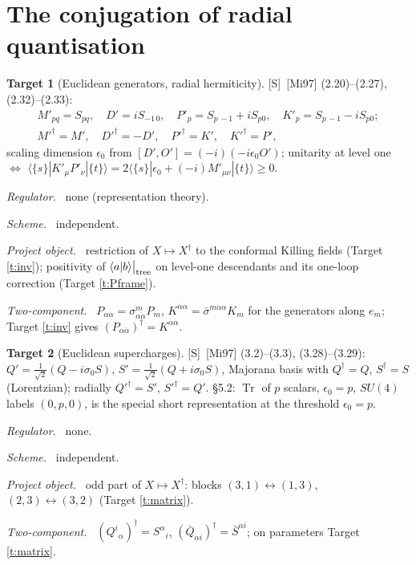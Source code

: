 \documentclass[11pt]{article}
\theoremstyle{definition}
\newtheorem{target}{Target}
\newcommand{\Tr}{\operatorname{Tr}}
\newcommand{\Sl}{\textup{[S]}}
\newcommand{\tree}{\big|_{\rm tree}}
\newcommand{\fld}[1]{\par\textit{#1.}\ }
\begin{document}
\section{The conjugation of radial quantisation}

\begin{target}[Euclidean generators, radial hermiticity]\label{t:mi-even}
\Sl\ [Mi97] (2.20)--(2.27), (2.32)--(2.33):
\[
\begin{gathered}
M'_{pq}=S_{pq},\quad D'=iS_{-1\,0},\quad P'_p=S_{p\,-1}+iS_{p0},\quad K'_p=S_{p\,-1}-iS_{p0};\\
M'^\dagger=M',\quad D'^\dagger=-D',\quad P'^\dagger=K',\quad K'^\dagger=P' ,
\end{gathered}
\]
scaling dimension $\epsilon_0$ from $[D',O']=(-i)(-i\epsilon_0O')$; unitarity at level one $\Leftrightarrow$ $\langle\{s\}|K'_\mu P'_\nu|\{t\}\rangle=2\langle\{s\}|\epsilon_0+(-i)M'_{\mu\nu}|\{t\}\rangle\ge0$.
\fld{Regulator} none (representation theory).
\fld{Scheme} independent.
\fld{Project object} restriction of $X\mapsto X^\dagger$ to the conformal Killing fields (Target \ref{t:inv}); positivity of $\langle a|b\rangle\tree$ on level-one descendants and its one-loop correction (Target \ref{t:Pframe}).
\fld{Two-component} $P_{\alpha\dot\alpha}=\sigma^m_{\alpha\dot\alpha}P_m$, $K^{\dot\alpha\alpha}=\bar\sigma^{m\dot\alpha\alpha}K_m$ for the generators along $e_m$; Target \ref{t:inv} gives $(P_{\alpha\dot\alpha})^\dagger=K^{\dot\alpha\alpha}$.
\end{target}

\begin{target}[Euclidean supercharges]\label{t:mi-odd}
\Sl\ [Mi97] (3.2)--(3.3), (3.28)--(3.29): $Q'=\tfrac1{\sqrt2}(Q-i\sigma_0S)$, $S'=\tfrac1{\sqrt2}(Q+i\sigma_0S)$, Majorana basis with $Q^\dagger=Q$, $S^\dagger=S$ (Lorentzian); radially $Q'^\dagger=S'$, $S'^\dagger=Q'$. \S5.2: $\Tr$ of $p$ scalars, $\epsilon_0=p$, $SU(4)$ labels $(0,p,0)$, is the special short representation at the threshold $\epsilon_0=p$.
\fld{Regulator} none. \fld{Scheme} independent.
\fld{Project object} odd part of $X\mapsto X^\dagger$: blocks $(3,1)\leftrightarrow(1,3)$, $(2,3)\leftrightarrow(3,2)$ (Target \ref{t:matrix}).
\fld{Two-component} $(Q^i{}_\alpha)^\dagger=S^\alpha{}_i$, $(\bar Q_{\dot\alpha i})^\dagger=\bar S^{\dot\alpha i}$; on parameters Target \ref{t:matrix}.
\end{target}
\end{document}
